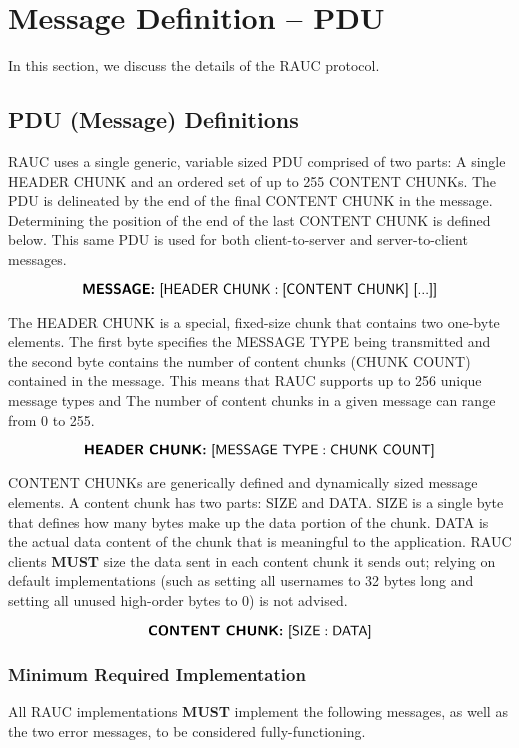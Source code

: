
\section{Message Definition -- PDU}
\label{sec:pdus}

In this section, we discuss the details of the \textsf{RAUC} protocol.
 
\subsection{PDU (Message) Definitions}
RAUC uses a single generic, variable sized PDU comprised of two parts: A single HEADER CHUNK and an ordered set of up to 255 CONTENT CHUNKs. The PDU is delineated by the end of the final CONTENT CHUNK in the message. Determining the position of the end of the last CONTENT CHUNK is defined below. This same PDU is used for both client-to-server and server-to-client messages.

\[\textsf{\textbf{MESSAGE:} [HEADER CHUNK} : \textsf{[CONTENT CHUNK] [...]]}\]

The HEADER CHUNK is a special, fixed-size chunk that contains two one-byte elements. The first byte specifies the MESSAGE TYPE being transmitted and the second byte contains the number of content chunks (CHUNK COUNT) contained in the message. This means that RAUC supports up to 256 unique message types and The number of content chunks in a given message can range from 0 to 255.

\[\textsf{\textbf{HEADER CHUNK:} [MESSAGE TYPE} : \textsf{CHUNK COUNT]}\]

CONTENT CHUNKs are generically defined and dynamically sized message elements. A content chunk has two parts: SIZE and DATA. SIZE is a single byte that defines how many bytes make up the data portion of the chunk. DATA is the actual data content of the chunk that is meaningful to the application. RAUC clients \textbf{MUST} size the data sent in each content chunk it sends out; relying on default implementations (such as setting all usernames to 32 bytes long and setting all unused high-order bytes to 0) is not advised.

\[\textsf{\textbf{CONTENT CHUNK:} [SIZE} : \textsf{DATA]}\]



\subsubsection{Minimum Required Implementation}
All RAUC implementations \textbf{MUST} implement the following  messages, as well as the two error messages, to be considered fully-functioning.

